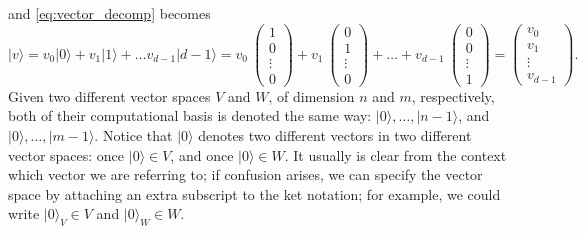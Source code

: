 \documentclass{article}
\theoremstyle{definition}
\newcommand{\ket}[1]{\vert #1 \rangle}
\begin{document}
and \cref{eq:vector_decomp} becomes 
\begin{equation*}
    \ket{v} = v_0 \ket{0} + v_1 \ket{1} +\dots v_{d-1} \ket{d-1} = v_0 \ \begin{pmatrix} 1 \\ 0 \\ \vdots \\ 0 \end{pmatrix}+ v_1\ 
      \begin{pmatrix} 0 \\ 1 \\ \vdots \\ 0 \end{pmatrix} + \dots + v_{d-1}\ \begin{pmatrix} 0 \\ 0 \\ \vdots \\ 1 \end{pmatrix} =  \begin{pmatrix} v_0 \\ v_1 \\ \vdots \\ v_{d-1} \end{pmatrix}.
\end{equation*}
Given two different vector spaces $V$ and $W$, of dimension $n$ and $m$, respectively, both of their computational basis is denoted the same way: $\ket{0}, \ldots, \ket{n-1}$, and $\ket{0},\ldots, \ket{m-1}$. Notice that $\ket{0}$ denotes two different vectors in two different vector spaces: once $\ket{0}\in V$, and once $\ket{0}\in W$. It usually is clear from the context which vector we are referring to; if confusion arises, we can specify the vector space by attaching an extra subscript to the ket notation; for example, we could write $\ket{0}_V \in V$ and $\ket{0}_W\in W$.
\end{document}

